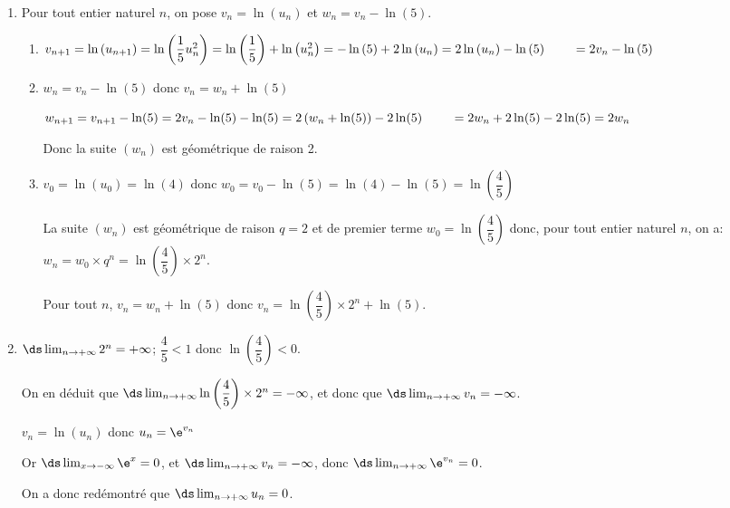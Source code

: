 \begin{enumerate}
\begin{enumerate}
$x=\dfrac{1}{5}x^2 \iff x\left (1-\dfrac{1}{5}x\right )=0
\iff x=0 \text{ ou } x=5$

Or, pour tout $n$, on a: $0<u_n\leqslant 4$ donc $\ell$ vérifie $0\leqslant \ell \leqslant 4$. La solution $\ell=5$ n'est donc pas valable donc $\ell=0$.
		
	\end{enumerate}
\item Pour tout entier naturel $n$, on pose $v_n = \ln \left(u_n\right)$ et $w_n = v_n - \ln (5)$.
	\begin{enumerate}
		\item %
$v_{n+1} = \ln \left (u_{n+1}\right ) = \ln \left (\dfrac{1}{5}u_n^2\right )
= \ln \left ( \dfrac{1}{5}\right ) + \ln \left ( u_n^2 \right )
= - \ln \left (5\right ) +2 \ln \left (u_n\right )
=2 \ln\left (u_n\right ) -\ln \left (5\right )\\
\phantom{v_{n+1}}
=2 v_n -\ln \left (5\right )$		
		
		\item %
$w_n = v_n - \ln (5)$ donc $v_n=w_n+ \ln(5)$

$w_{n+1} =v_{n+1} - \ln(5) = 2 v_n -\ln(5) -\ln(5)
= 2\left (w_n +\ln(5)\mathstrut\right ) -2\ln(5)\\
\phantom{w_{n+1}}
=2 w_n +2\ln(5)-2\ln(5)=2w_n$		
		
Donc la suite $\left(w_n\right)$ est géométrique de raison 2.
		
		\item %
$v_0=\ln\left (u_0\right )=\ln(4)$ donc $w_0=v_0-\ln(5)=\ln(4)-\ln(5) = \ln \left (\dfrac{4}{5}\right )$

La suite $(w_n)$ est géométrique de raison $q=2$ et de premier terme $w_0=\ln\left (\dfrac{4}{5}\right )$ donc, pour tout entier naturel $n$, on a:
$w_n=w_0\times q^n = \ln\left (\dfrac{4}{5}\right ) \times 2^n$.

Pour tout $n$, $v_n=w_n +\ln(5)$ donc $v_n = \ln\left (\dfrac{4}{5}\right )\times 2^n +\ln(5)$.		
			\end{enumerate}
			
\item %
$\ds\lim_{n\to +\infty} 2^n=+\infty$;
$\dfrac{4}{5}<1$ donc $\ln\left (\dfrac{4}{5}\right )<0$.

On en déduit que $\ds\lim_{n\to +\infty} \ln\left (\dfrac{4}{5}\right )\times 2^n=-\infty$, et donc que $\ds\lim_{n\to +\infty} v_n=-\infty$.

$v_n=\ln\left (u_n\right )$ donc $u_n=\e^{v_n}$

Or $\ds\lim_{x\to -\infty} \e^{x}=0$, et $\ds\lim_{n\to +\infty} v_n=-\infty$, donc $\ds\lim_{n\to +\infty} \e^{v_n}=0$.

On a donc redémontré que $\ds\lim_{n\to +\infty} u_n=0$.


\end{enumerate}

\vspace{0.5cm}

